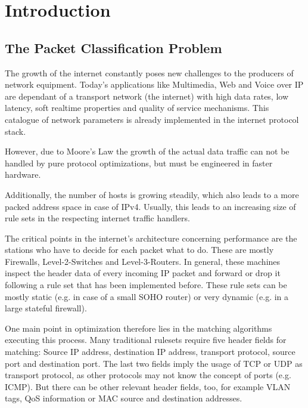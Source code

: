 \documentclass[a4paper,
		12pt,
		parskip=full,
		titlepage
		]{scrartcl}
\begin{document}


\setcounter{page}{1}
\tableofcontents{}

\pagebreak

\pagestyle{scrheadings}

\section{Introduction}
\subsection{The Packet Classification Problem}
The growth of the internet constantly poses new challenges to the producers of network equipment.
Today's applications like Multimedia, Web and Voice over IP are dependant of a transport network (the internet) with
high data rates, low latency, soft realtime properties and quality of service mechanisms.
This catalogue of network parameters is already implemented in the internet protocol stack.

However, due to Moore's Law the growth of the actual data traffic can not be handled by pure protocol optimizations, 
but must be engineered in faster hardware.

Additionally, the number of hosts is growing steadily, which also leads to a more packed address space in case of IPv4.
Usually, this leads to an increasing size of rule sets in the respecting internet traffic handlers. %

The critical points in the internet's architecture concerning performance are the stations who have to decide for each packet what to do.
These are mostly Firewalls, Level-2-Switches and Level-3-Routers.
In general, these machines inspect the header data of every incoming IP packet and forward or drop it following a rule set that has been implemented before.
These rule sets can be mostly static (e.g. in case of a small SOHO router) or very dynamic (e.g. in a large stateful firewall).

One main point in optimization therefore lies in the matching algorithms executing this process.
Many traditional rulesets require five header fields for matching: Source IP address, destination IP address, transport protocol, source port and destination port.
The last two fields imply the usage of TCP or UDP as transport protocol, as other protocols may not know the concept of ports (e.g. ICMP). %
But there can be other relevant header fields, too, for example VLAN tags, QoS information or MAC source and destination addresses.
\end{document}
